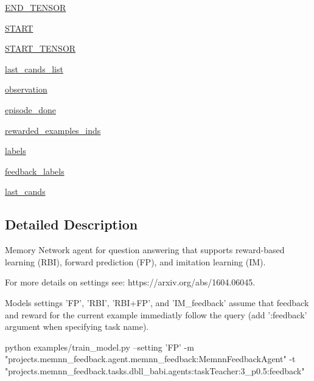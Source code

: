 \begin{DoxyCompactItemize}
\item 
\hyperlink{classagent_1_1memnn__feedback_1_1MemnnFeedbackAgent_a8dff3d8b80fbd93d105463cdb6b72172}{E\+N\+D\+\_\+\+T\+E\+N\+S\+OR}
\item 
\hyperlink{classagent_1_1memnn__feedback_1_1MemnnFeedbackAgent_ae3e0b3d242068dc1d3d2f7d53eee618b}{S\+T\+A\+RT}
\item 
\hyperlink{classagent_1_1memnn__feedback_1_1MemnnFeedbackAgent_af0815aa9e533e7ea8698304c0f5e8e53}{S\+T\+A\+R\+T\+\_\+\+T\+E\+N\+S\+OR}
\item 
\hyperlink{classagent_1_1memnn__feedback_1_1MemnnFeedbackAgent_afb63cabe776dc8dc2a324a4c185843a1}{last\+\_\+cands\+\_\+list}
\item 
\hyperlink{classagent_1_1memnn__feedback_1_1MemnnFeedbackAgent_a1049b4808227afc99e3966614f4b4e6b}{observation}
\item 
\hyperlink{classagent_1_1memnn__feedback_1_1MemnnFeedbackAgent_a1c5d0b617a396dcc3e4515a1d464572e}{episode\+\_\+done}
\item 
\hyperlink{classagent_1_1memnn__feedback_1_1MemnnFeedbackAgent_ac49716fcde2a899d5f3918c8bf39d7df}{rewarded\+\_\+examples\+\_\+inds}
\item 
\hyperlink{classagent_1_1memnn__feedback_1_1MemnnFeedbackAgent_a0747ac59d08b66066693a55caa72c2e9}{labels}
\item 
\hyperlink{classagent_1_1memnn__feedback_1_1MemnnFeedbackAgent_a81ef3e328b096871c15c1a28df0d988e}{feedback\+\_\+labels}
\item 
\hyperlink{classagent_1_1memnn__feedback_1_1MemnnFeedbackAgent_a84c8c8e20e9694a121817c0faff02b32}{last\+\_\+cands}
\end{DoxyCompactItemize}


\subsection{Detailed Description}
\begin{DoxyVerb}Memory Network agent for question answering that supports
reward-based learning (RBI), forward prediction (FP), and imitation learning (IM).

For more details on settings see: https://arxiv.org/abs/1604.06045.

Models settings 'FP', 'RBI', 'RBI+FP', and 'IM_feedback' assume that
feedback and reward for the current example immediatly follow the query
(add ':feedback' argument when specifying task name).

python examples/train_model.py --setting 'FP'
-m "projects.memnn_feedback.agent.memnn_feedback:MemnnFeedbackAgent"
-t "projects.memnn_feedback.tasks.dbll_babi.agents:taskTeacher:3_p0.5:feedback"
\end{DoxyVerb}
 

